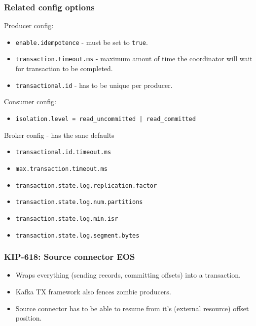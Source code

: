 \documentclass[10pt,utf8]{beamer}
\begin{document}
\begin{frame}
    \frametitle{Related config options}
    Producer config:
    \begin{itemize}
        \item \texttt{enable.idempotence} - must be set to \texttt{true}.
        \item \texttt{transaction.timeout.ms} - maximum amout of time the coordinator will wait for transaction to be completed.
        \item \texttt{transactional.id} - has to be unique per producer.
    \end{itemize}
    
    \vspace{0.5cm}
    
    Consumer config:
    \begin{itemize}
     \item \texttt{isolation.level = read\_uncommitted | read\_committed}
    \end{itemize}
    
    \vspace{0.5cm}
    
    Broker config - has the sane defaults
    \begin{itemize}
      \item \texttt{transactional.id.timeout.ms}
      \item \texttt{max.transaction.timeout.ms}
      \item \texttt{transaction.state.log.replication.factor}
      \item \texttt{transaction.state.log.num.partitions}
      \item \texttt{transaction.state.log.min.isr}
      \item \texttt{transaction.state.log.segment.bytes}
    \end{itemize}
\end{frame}

\begin{frame}
    \frametitle{KIP-618: Source connector EOS}
    \begin{itemize}
      \item Wraps everything (sending records, committing offsets) into a transaction.
      \item Kafka TX framework also fences zombie producers.
      \item Source connector has to be able to resume from it's (external resource) offset position.
    \end{itemize}
\end{frame}
\end{document}
